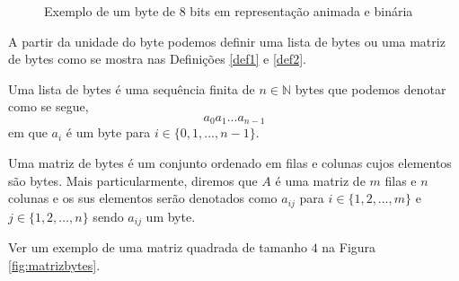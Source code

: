 \begin{figure}[!ht]
\begin{figurebox}
\begin{center}
\end{center}\caption{Exemplo de um byte de 8 bits em representação animada e binária}\label{fig:byte}
\end{figurebox}
\end{figure}


 A partir da unidade do byte podemos definir uma lista de bytes ou uma matriz de bytes como se mostra nas Definições \ref{def1} e \ref{def2}.
\begin{definition}\label{def1}
Uma lista de bytes é uma sequência finita de $n\in \mathbb{N}$ bytes que podemos denotar como se segue,
$$a_0 a_1 ...a_{n-1}$$
em que $a_{i}$ é um byte para $i \in \{0,1,...,n-1\}$.
\end{definition}

\begin{definition}\label{def2}
Uma matriz de bytes é um conjunto ordenado em filas e colunas cujos elementos são bytes. Mais particularmente, diremos que $A$ é uma matriz de $m$ filas e $n$ colunas e os sus elementos serão denotados como $a_{ij}$ para $i \in \{1,2,\dots, m\}$ e $j \in \{1,2,\dots, n\}$ sendo $a_{ij}$ um byte.
\end{definition}
Ver um exemplo de uma matriz quadrada de tamanho $4$ na Figura \ref{fig:matrizbytes}.

